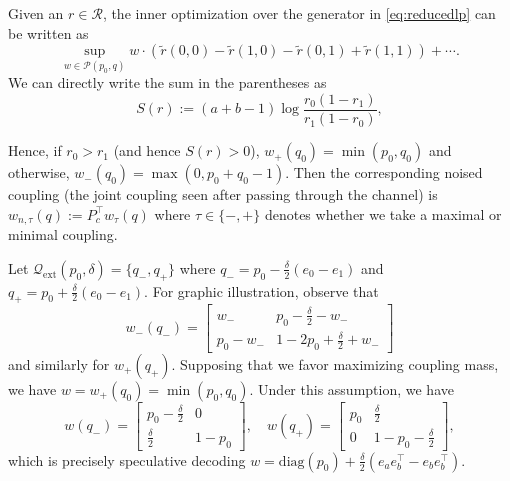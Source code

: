 \documentclass[12pt]{article}
\theoremstyle{plain}
\theoremstyle{definition}
\begin{document}
Given an $r \in \mathcal{R}$, the inner optimization over the generator in \eqref{eq:reducedlp} can be written as 
\[\sup_{w \in \mathcal{P}(p_0,q)} w\cdot (\tilde{r}(0,0) - \tilde{r}(1,0) - \tilde{r}(0,1) + \tilde{r}(1,1)) + \cdots.\]
We can directly write the sum in the parentheses as 
\[S(r) := (a+b-1)\log \frac{r_0(1-r_1)}{r_1(1-r_0)},\]

Hence, if $r_0 > r_1$ (and hence $S(r) > 0$), $w_+(q_0) = \min(p_0,q_0)$ and otherwise, $w_-(q_0) = \max(0,p_0+q_0-1)$. Then the corresponding noised coupling (the joint coupling seen after passing through the channel) is $w_{n,\tau}(q) := P_c^\top w_\tau(q)$ where $\tau \in \{-,+\}$ denotes whether we take a maximal or minimal coupling.

Let $\mathcal{Q}_{\text{ext}}(p_0,\delta) = \{q_-,q_+\}$ where $q_- = p_0 - \frac{\delta}{2}(e_0-e_1)$ and $q_+ = p_0 + \frac{\delta}{2}(e_0-e_1)$. For graphic illustration, observe that 
\[w_{-}(q_-) = \begin{bmatrix}
    w_- & p_0-\frac{\delta}{2}-w_- \\
    p_0 - w_- & 1-2p_0 + \frac{\delta}{2} + w_-
\end{bmatrix}\]
and similarly for $w_{+}(q_+)$. Supposing that we favor maximizing coupling mass, we have $w = w_+(q_0) = \min (p_0,q_0)$. Under this assumption, we have 
\[w(q_-) = \begin{bmatrix}
    p_0 - \frac{\delta}{2} & 0 \\
    \frac{\delta}{2} & 1- p_0
\end{bmatrix}, \quad w(q_+) = \begin{bmatrix}
    p_0 & \frac{\delta}{2} \\
    0 & 1-p_0 -\frac{\delta}{2}
\end{bmatrix},\]
which is precisely speculative decoding $w = \text{diag}(p_0) + \frac{\delta}{2}(e_{a}e_{b}^\top - e_{b}e_{b}^\top)$.
\end{document}
